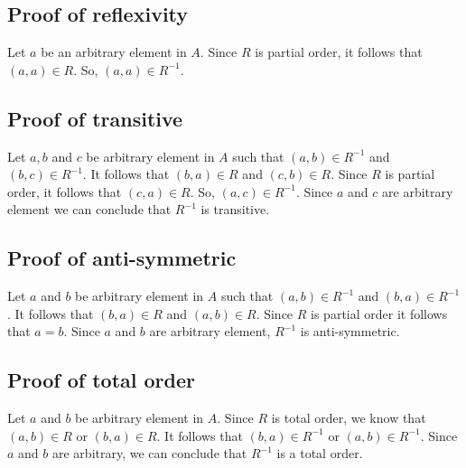 \documentclass{article}
\begin{document}
\subsection{Proof of reflexivity}
Let $a$ be an arbitrary element in $A$. Since $R$ is partial order, it
follows that $(a,a) \in R$. So, $(a,a) \in R^{-1}$.
\subsection{Proof of transitive}
Let $a,b$ and $c$ be arbitrary element in $A$ such that $(a,b) \in
R^{-1}$ and $(b,c) \in R^{-1}$. It follows that $(b,a) \in R$ and
$(c,b) \in R$. Since $R$ is partial order, it follows that $(c,a) \in
R$. So, $(a,c) \in R^{-1}$. Since $a$ and $c$ are arbitrary element we
can conclude that $R^{-1}$ is transitive.
\subsection{Proof of anti-symmetric}
Let $a$ and $b$ be arbitrary element in $A$ such that $(a,b) \in
R^{-1}$ and $(b,a) \in R^{-1}$. It follows that $(b,a) \in R$ and
$(a,b) \in R$. Since $R$ is partial order it follows that $a = b$.
Since $a$ and $b$ are arbitrary element, $R^{-1}$ is anti-symmetric.
\subsection{Proof of total order}
Let $a$ and $b$ be arbitrary element in $A$. Since $R$ is total order,
we know that $(a,b) \in R$ or $(b,a) \in R$. It follows that $(b,a)
\in R^{-1}$ or $(a,b) \in R^{-1}$. Since $a$ and $b$ are arbitrary, we
can conclude that $R^{-1}$ is a total order.
\end{document}
